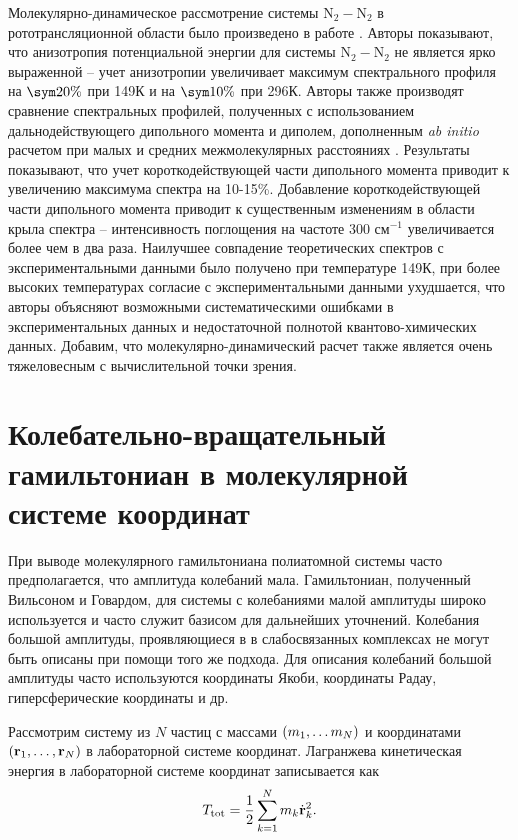 Молекулярно-динамическое рассмотрение системы N$_2-$N$_2$ в рототрансляционной области было произведено в работе \cite{bussery2014}. Авторы показывают, что анизотропия потенциальной энергии для системы N$_2-$N$_2$ не является ярко выраженной -- учет анизотропии увеличивает максимум спектрального профиля на $\sym 20\%$ при 149К и на $\sym 10\%$ при 296К. Авторы также производят сравнение спектральных профилей, полученных с использованием дальнодействующего дипольного момента и диполем, дополненным \textit{ab initio} расчетом при малых и средних межмолекулярных расстояниях \cite{lokshtanov2008}. Результаты показывают, что учет короткодействующей части дипольного момента приводит к увеличению максимума спектра на 10-15\%. Добавление короткодействующей части дипольного момента приводит к существенным изменениям в области крыла спектра -- интенсивность поглощения на частоте 300 см$^{-1}$ увеличивается более чем в два раза. Наилучшее совпадение теоретических спектров с экспериментальными данными было получено при температуре 149К, при более высоких температурах согласие с экспериментальными данными ухудшается, что авторы объясняют возможными систематическими ошибками в экспериментальных данных и недостаточной полнотой квантово-химических данных. Добавим, что молекулярно-динамический расчет также является очень тяжеловесным с вычислительной точки зрения.

\section{Колебательно-вращательный гамильтониан в молекулярной системе координат}

При выводе молекулярного гамильтониана полиатомной системы часто предполагается, что амплитуда колебаний мала. Гамильтониан, полученный Вильсоном и Говардом, для системы с колебаниями малой амплитуды широко используется и часто служит базисом для дальнейших уточнений. Колебания большой амплитуды, проявляющиеся в в слабосвязанных комплексах не могут быть описаны при помощи того же подхода. Для описания колебаний большой амплитуды часто используются координаты Якоби, координаты Радау, гиперсферические координаты и др. \par 
Рассмотрим систему из $N$ частиц с массами $\left( m_1, \dots m_N \right)$ и координатами $\left( \mathbf{r}_1, \dots, \mathbf{r}_N \right)$ в лабораторной системе координат. Лагранжева кинетическая энергия в лабораторной системе координат записывается как
\begin{gather}
    T_\text{tot} = \frac{1}{2} \sum_{k = 1}^N m_k \dot{\mathbf{r}}_k^2.
\end{gather}

